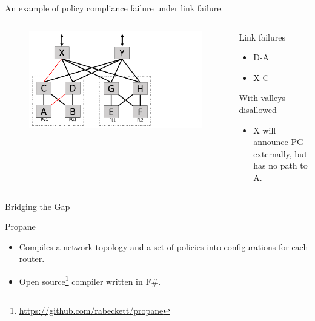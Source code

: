 \begin{frame}{An example of policy compliance failure under link failure.}
    \begin{columns}
        \begin{column}{0.45\textwidth}
            \begin{figure}
                \includegraphics[width=1\textwidth,keepaspectratio,clip,trim={0cm 0cm 9cm 0cm}]{figures/ex2_2_failed_links.pdf}
            \end{figure}
        \end{column}
        \begin{column}{0.50\textwidth}
            \begin{block}{Link failures}
                \begin{itemize}
                    \item D-A
                    \item X-C
                \end{itemize}
            \end{block}
            \begin{block}{With valleys disallowed}
                \begin{itemize}
                    \item X will announce PG externally, but has no path to A.
                \end{itemize}
            \end{block}
        \end{column}
    \end{columns}
\end{frame}


\begin{frame}{Bridging the Gap}
    \begin{block}{Propane}
        \begin{itemize}
            \item Compiles a network topology and a set of policies into configurations for each router.
            \item Open source\footnote{\url{https://github.com/rabeckett/propane}} compiler written in F\#.
        \end{itemize}
    \end{block}
\end{frame}

